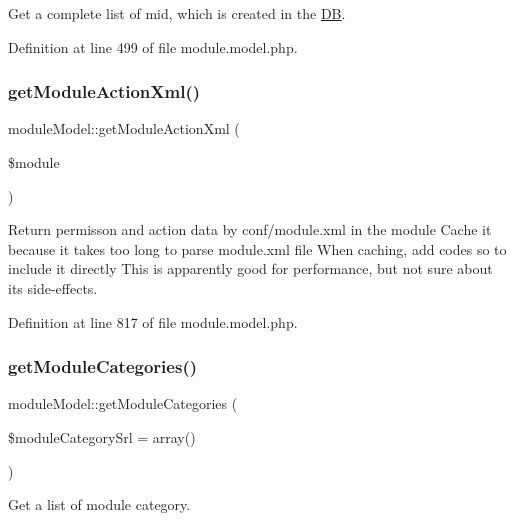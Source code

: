 Get a complete list of mid, which is created in the \hyperlink{classDB}{DB}. 



Definition at line 499 of file module.\+model.\+php.

\mbox{\label{classmoduleModel_a2d53da77f2504357f99b93a2ad09981a}} 
\subsubsection{\texorpdfstring{get\+Module\+Action\+Xml()}{getModuleActionXml()}}
{\footnotesize\ttfamily module\+Model\+::get\+Module\+Action\+Xml (\begin{DoxyParamCaption}\item[{}]{\$module }\end{DoxyParamCaption})}



Return permisson and action data by conf/module.\+xml in the module Cache it because it takes too long to parse module.\+xml file When caching, add codes so to include it directly This is apparently good for performance, but not sure about its side-\/effects. 



Definition at line 817 of file module.\+model.\+php.

\mbox{\label{classmoduleModel_a253e39c41e241e2f3fa914ce5d915963}} 
\subsubsection{\texorpdfstring{get\+Module\+Categories()}{getModuleCategories()}}
{\footnotesize\ttfamily module\+Model\+::get\+Module\+Categories (\begin{DoxyParamCaption}\item[{}]{\$module\+Category\+Srl = {\ttfamily array()} }\end{DoxyParamCaption})}



Get a list of module category. 




